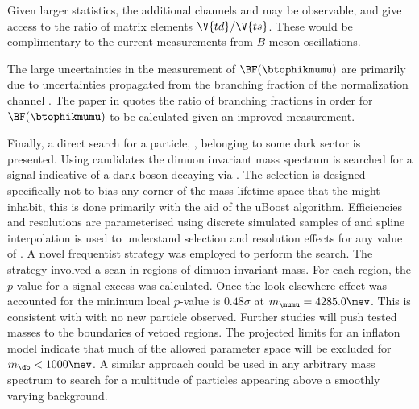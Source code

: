 

Given larger statistics, the additional channels \decay{\Bp}{\Kp\Km\pip\mumu} and
\decay{\Bp}{\pip\pipi\mumu}
may be observable, and give access to the ratio of \ckm matrix elements $\V{td}/\V{ts}$.
These would be complimentary to the current
measurements from $B$-meson oscillations.

The large uncertainties in the measurement of $\BF(\btophikmumu)$ are primarily due to
uncertainties propagated from the branching fraction of the normalization channel \btojpsiphik.
The paper in  quotes the ratio of branching fractions in order for
$\BF(\btophikmumu)$ to be calculated given an improved measurement.


Finally, a direct search for a \np particle, \db, belonging to some dark sector is presented.
Using
\btokstrmumu candidates the dimuon invariant mass spectrum is searched for a signal indicative of a
dark boson decaying via \dbtomumu.
The selection is designed specifically not to bias any corner of the mass-lifetime space that the
\db might inhabit, this is done primarily with the aid of the uBoost algorithm.
Efficiencies and resolutions are parameterised using discrete simulated samples of \btokstrdb
and spline interpolation is used to understand selection and resolution effects for any value of
\mass{\db}.
A novel frequentist strategy was employed to perform the search.
The strategy involved a scan in regions of dimuon invariant mass.
For each region, the $p$-value for a signal excess was calculated.
Once the look elsewhere effect was accounted for the minimum local $p$-value is $0.48\sigma$ at
$m_{\mumu}=4285.0\mev$.
This is consistent with with no new particle observed.
Further studies will push tested masses to the boundaries of vetoed regions.
The projected limits for an inflaton model indicate that much of the allowed parameter space will
be excluded for $m_\db<1000\mev$.
A similar approach could be used in any arbitrary mass spectrum to search for a multitude of
particles appearing above a smoothly varying background.


